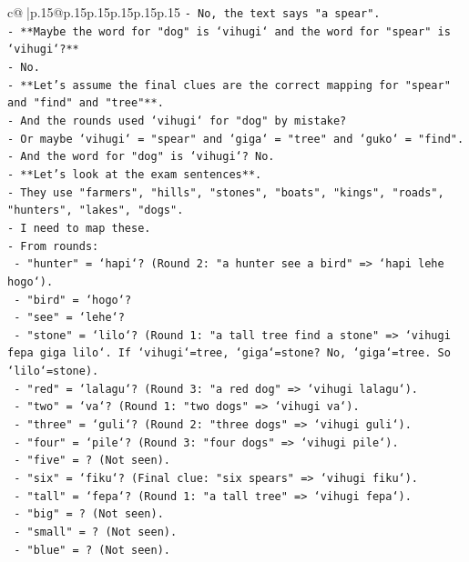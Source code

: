 \documentclass{article}
\begin{document}
{\begin{supertabular}{c@{$\;$}|p{.15\linewidth}@{}p{.15\linewidth}p{.15\linewidth}p{.15\linewidth}p{.15\linewidth}p{.15\linewidth}}
{{{\texttt{{-} No, the text says "a spear".} \\
\texttt{{-} **Maybe the word for "dog" is `vihugi` and the word for "spear" is `vihugi`?**} \\
\texttt{{-} No.} \\
\texttt{{-} **Let's assume the final clues are the correct mapping for "spear" and "find" and "tree"**.} \\
\texttt{{-} And the rounds used `vihugi` for "dog" by mistake?} \\
\texttt{{-} Or maybe `vihugi` = "spear" and `giga` = "tree" and `guko` = "find".} \\
\texttt{{-} And the word for "dog" is `vihugi`? No.} \\
\texttt{{-} **Let's look at the exam sentences**.} \\
\texttt{{-} They use "farmers", "hills", "stones", "boats", "kings", "roads", "hunters", "lakes", "dogs".} \\
\texttt{{-} I need to map these.} \\
\texttt{{-} From rounds:} \\
\texttt{  {-} "hunter" = `hapi`? (Round 2: "a hunter see a bird" => `hapi lehe hogo`).} \\
\texttt{  {-} "bird" = `hogo`?} \\
\texttt{  {-} "see" = `lehe`?} \\
\texttt{  {-} "stone" = `lilo`? (Round 1: "a tall tree find a stone" => `vihugi fepa giga lilo`. If `vihugi`=tree, `giga`=stone? No, `giga`=tree. So `lilo`=stone).} \\
\texttt{  {-} "red" = `lalagu`? (Round 3: "a red dog" => `vihugi lalagu`).} \\
\texttt{  {-} "two" = `va`? (Round 1: "two dogs" => `vihugi va`).} \\
\texttt{  {-} "three" = `guli`? (Round 2: "three dogs" => `vihugi guli`).} \\
\texttt{  {-} "four" = `pile`? (Round 3: "four dogs" => `vihugi pile`).} \\
\texttt{  {-} "five" = ? (Not seen).} \\
\texttt{  {-} "six" = `fiku`? (Final clue: "six spears" => `vihugi fiku`).} \\
\texttt{  {-} "tall" = `fepa`? (Round 1: "a tall tree" => `vihugi fepa`).} \\
\texttt{  {-} "big" = ? (Not seen).} \\
\texttt{  {-} "small" = ? (Not seen).} \\
\texttt{  {-} "blue" = ? (Not seen).} \\
}}}
\end{supertabular}}
\end{document}
